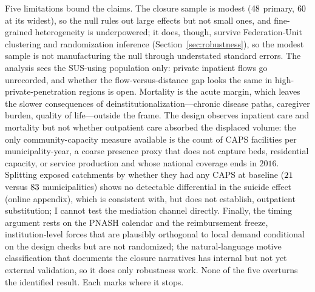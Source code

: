 Five limitations bound the claims. The closure sample is modest
($48$ primary, $60$ at its widest), so
the null rules out large effects but not small ones, and fine-grained
heterogeneity is underpowered; it does, though, survive Federation-Unit
clustering and randomization inference (Section~\ref{sec:robustness}), so
the modest sample is not manufacturing the null through understated
standard errors. The analysis sees the SUS-using population only: private
inpatient flows go unrecorded, and whether the flow-versus-distance gap
looks the same in high-private-penetration regions is open. Mortality is
the acute margin, which leaves the slower consequences of
deinstitutionalization---chronic disease paths, caregiver burden, quality
of life---outside the frame. The design observes inpatient care and
mortality but not whether outpatient care absorbed the displaced volume:
the only community-capacity measure available is the count of CAPS
facilities per municipality-year, a coarse presence proxy that does not
capture beds, residential capacity, or service production and whose
national coverage ends in $2016$. Splitting exposed catchments by whether
they had any CAPS at baseline ($21$ versus $83$
municipalities) shows no detectable differential in the suicide effect
(online appendix), which is consistent with, but does not establish,
outpatient substitution; I cannot test the mediation channel directly.
Finally, the timing argument rests on the PNASH calendar and the
reimbursement freeze, institution-level forces that are plausibly
orthogonal to local demand conditional on the design checks but are not
randomized; the natural-language motive classification that documents the
closure narratives has internal but not yet external validation, so it does
only robustness work. None of the five overturns the identified result.
Each marks where it stops.
